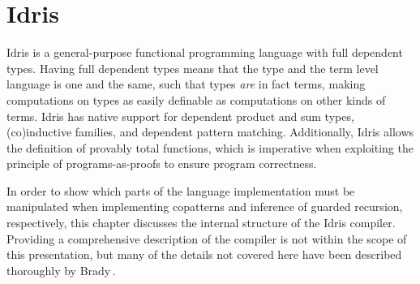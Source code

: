 \chapter{Idris}
\label{cha:idris}
Idris is a general-purpose functional programming language with full dependent
types. Having full dependent types means that the type and the term level
language is one and the same, such that types \emph{are} in fact terms, making
computations on types as easily definable as computations on other kinds of
terms. Idris has native support for dependent product and sum types,
(co)inductive families, and dependent pattern matching. Additionally, Idris
allows the definition of provably total functions, which is imperative when
exploiting the principle of programs-as-proofs to ensure program correctness. 

In order to show which parts of the language implementation must be manipulated
when implementing copatterns and inference of guarded recursion, respectively, this chapter
discusses the internal structure of the Idris compiler. Providing a
comprehensive description of the compiler is not within the scope of this
presentation, but many of the details not covered
here have been described thoroughly by Brady\,\citep{BradyIdrisImpl13}.

